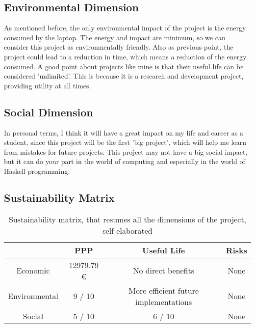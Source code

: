 \subsection{Environmental Dimension}
As mentioned before, the only environmental impact of the project is the energy consumed by the laptop. 
The energy and impact are minimum, so we can consider this project as environmentally friendly.
Also as previous point, the project could lead to a reduction in time, which means a reduction of the energy consumed.
A good point about projects like mine is that their useful life can be considered 'unlimited'.
This is because it is a research and development project, providing utility at all times.
\subsection{Social Dimension}
In personal terms, I think it will have a great impact on my life and career as a student, since this project will be the first 'big project', which will help me learn from mistakes for future projects.
This project may not have a big social impact, but it can do your part in the world of computing and especially in the world of Haskell programming.
\subsection{Sustainability Matrix}
\begin{table}[H]
    \begin{adjustwidth}{-1in}{-1in} %
    \centering
    \begin{tabular}{|c|c|c|c|}
    \hline
    \textbf{} & \textbf{PPP} & \textbf{Useful Life} & \textbf{Risks} \\ 
    \hline
    Economic & 12979.79 € & No direct benefits & None\\
    \hline
    Environmental & 9 / 10 & More efficient future implementations & None\\
    \hline
    Social & 5 / 10 & 6 / 10 & None \\
    \hline
    \end{tabular}
    \caption[{[B\&S] Sustainability Matrix}]{Sustainability matrix, that resumes all the dimensions of the project, self elaborated}
    \label{sustainability_matrix}
    \end{adjustwidth}
    \end{table}
